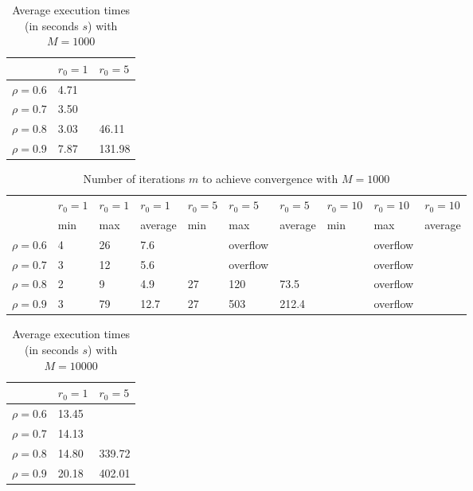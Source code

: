 \documentclass[a4paper,11pt,openright]{report}
\begin{document}
\begin{table}[H]
\centering
\addtolength{\leftskip}{-1.5cm}
\addtolength{\rightskip}{-1.5cm}
\begin{tabular}{|c|ll|}
\hline
$ $ & $r_0 = 1$ & $r_0 = 5$ \\
\hline
$\rho = 0.6$ & 4.71 & \\

$\rho = 0.7$ & 3.50 & \\

$\rho = 0.8$ & 3.03 & 46.11\\

$\rho = 0.9$ & 7.87 & 131.98\\
\hline
\end{tabular}
\caption{Average execution
 times (in seconds $s$) with $M = 1000$}
\end{table}
\begin{table}[H]
\centering
\addtolength{\leftskip}{-1.5cm}
\addtolength{\rightskip}{-1.5cm}
\begin{tabular}{|c|lllllllll|}
\hline
$ $ & $r_0 = 1$ & $r_0 = 1$ & $r_0 = 1$ & $r_0 = 5$ & $r_0 = 5$ & $r_0 = 5$ & $r_0 = 10$ & $r_0 = 10$ & $r_0 = 10$  \\
$ $ & min & max & average & min & max & average & min & max & average \\ 
\hline
$\rho = 0.6$ & 4 & 26 & 7.6 &  & overflow &  &  & overflow &  \\

$\rho = 0.7$ & 3 & 12 & 5.6 &  & overflow &  &  & overflow &  \\

$\rho = 0.8$ & 2 & 9 & 4.9 & 27 & 120 & 73.5 &  & overflow &  \\

$\rho = 0.9$ & 3 & 79 & 12.7 & 27 & 503 & 212.4 &  & overflow &  \\
\hline
\end{tabular}
\caption{Number of iterations $m$ to achieve convergence with $M = 1000$}
\end{table}
\begin{table}[H]
\centering
\addtolength{\leftskip}{-1.5cm}
\addtolength{\rightskip}{-1.5cm}
\begin{tabular}{|c|ll|}
\hline
$ $ & $r_0 = 1$ & $r_0 = 5$  \\
\hline
$\rho = 0.6$ & 13.45 & \\

$\rho = 0.7$ & 14.13 & \\

$\rho = 0.8$ & 14.80 & 339.72\\

$\rho = 0.9$ & 20.18 & 402.01\\
\hline
\end{tabular}
\caption{Average execution
 times (in seconds $s$) with $M = 10000$}
\end{table}
\end{document}
